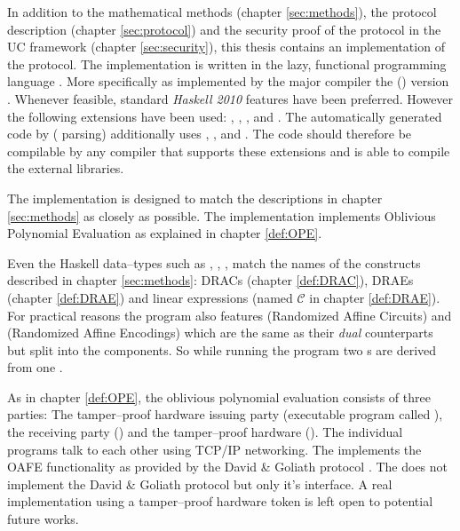 \label{sec:implementation}

In addition to the mathematical methods (chapter \ref{sec:methods}), the
protocol description (chapter \ref{sec:protocol}) and the security proof of the
protocol in the UC framework (chapter \ref{sec:security}), this thesis contains
an implementation of the protocol. The implementation is written in the lazy,
functional programming language \JWTLhaskell{}. More specifically \JWThaskell{}
as implemented by the major \JWThaskell{} compiler the \JWTXLghc{} (\JWTghc{})
version \JWTVghc{}. Whenever feasible, standard \emph{Haskell 2010}
\cite{haskell2010} features have been preferred. However the following
extensions have been used: ,
, , and
.  The automatically generated code by
 (\JWTprotobuf{} parsing) additionally uses
, , and
. The code should therefore be compilable by any
\JWThaskell{} compiler that supports these extensions and is able to compile the
external libraries.

The implementation is designed to match the descriptions in chapter
\ref{sec:methods} as closely as possible. The implementation implements
Oblivious Polynomial Evaluation as explained in chapter \ref{def:OPE}.

Even the Haskell data--types such as , , ,
 match the names of the constructs described in chapter
\ref{sec:methods}: DRACs (chapter \ref{def:DRAC}), DRAEs (chapter
\ref{def:DRAE}) and linear expressions (named $\mathcal{C}$ in chapter
\ref{def:DRAE}). For practical reasons the program also features 
(Randomized Affine Circuits) and  (Randomized Affine Encodings)
which are the same as their \emph{dual} counterparts but split into the
components. So while running the program two s are derived from one
.

As in chapter \ref{def:OPE}, the oblivious polynomial evaluation consists of
three parties: The tamper--proof hardware issuing party \JWpOne{} (executable
program called \JWBpOne{}), the receiving party \JWpTwo{} (\JWBpTwo{}) and the
tamper--proof hardware \JWtoken{} (\JWBtoken{}). The individual programs talk to
each other using TCP/IP networking. The \JWtoken{} implements the OAFE
functionality  as provided by the David \& Goliath
protocol \cite{davidgoliath}. The \JWtoken{} does not implement the
David \& Goliath protocol but only it's interface. A real implementation using a
tamper--proof hardware token is left open to potential future works.


